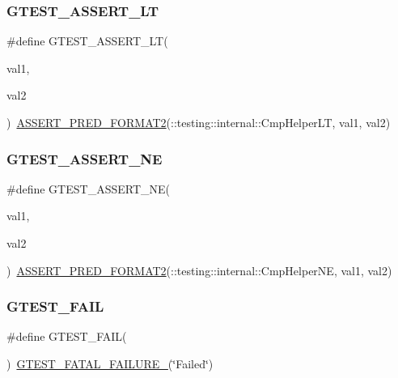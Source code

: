 \subsubsection{\texorpdfstring{GTEST\_ASSERT\_LT}{GTEST\_ASSERT\_LT}}
{\footnotesize\ttfamily \#define G\+T\+E\+S\+T\+\_\+\+A\+S\+S\+E\+R\+T\+\_\+\+LT(\begin{DoxyParamCaption}\item[{}]{val1,  }\item[{}]{val2 }\end{DoxyParamCaption})~\mbox{\hyperlink{_obj__test_2lib_2googletest-release-1_88_81_2googletest_2include_2gtest_2gtest__pred__impl_8h_ac452685a1a98ea3d96eb956a062ee210}{A\+S\+S\+E\+R\+T\+\_\+\+P\+R\+E\+D\+\_\+\+F\+O\+R\+M\+A\+T2}}(\+::testing\+::internal\+::\+Cmp\+Helper\+LT, val1, val2)}

\mbox{\label{_obj__test_2lib_2googletest-master_2googletest_2include_2gtest_2gtest_8h_a6fa9bb2b6731eba8f481e40e9e4931b3}} 
\subsubsection{\texorpdfstring{GTEST\_ASSERT\_NE}{GTEST\_ASSERT\_NE}}
{\footnotesize\ttfamily \#define G\+T\+E\+S\+T\+\_\+\+A\+S\+S\+E\+R\+T\+\_\+\+NE(\begin{DoxyParamCaption}\item[{}]{val1,  }\item[{}]{val2 }\end{DoxyParamCaption})~\mbox{\hyperlink{_obj__test_2lib_2googletest-release-1_88_81_2googletest_2include_2gtest_2gtest__pred__impl_8h_ac452685a1a98ea3d96eb956a062ee210}{A\+S\+S\+E\+R\+T\+\_\+\+P\+R\+E\+D\+\_\+\+F\+O\+R\+M\+A\+T2}}(\+::testing\+::internal\+::\+Cmp\+Helper\+NE, val1, val2)}

\mbox{\label{_obj__test_2lib_2googletest-master_2googletest_2include_2gtest_2gtest_8h_a636231436707c30d6778f79ae96f5dc6}} 
\subsubsection{\texorpdfstring{GTEST\_FAIL}{GTEST\_FAIL}}
{\footnotesize\ttfamily \#define G\+T\+E\+S\+T\+\_\+\+F\+A\+IL(\begin{DoxyParamCaption}{ }\end{DoxyParamCaption})~\mbox{\hyperlink{_obj__test_2lib_2googletest-release-1_88_81_2googletest_2include_2gtest_2internal_2gtest-internal_8h_a0f9a4c3ea82cc7bf4478eaffdc168358}{G\+T\+E\+S\+T\+\_\+\+F\+A\+T\+A\+L\+\_\+\+F\+A\+I\+L\+U\+R\+E\+\_\+}}(\char`\"{}Failed\char`\"{})}

